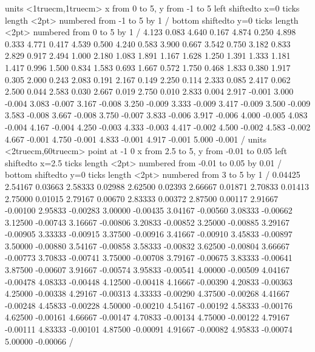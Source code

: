 \figure
\vbox{\beginpicture
\normalgraphs
\sevenpoint
\setcoordinatesystem units <1truecm,1truecm>
\setplotarea x from 0 to 5, y from -1 to 5
\axis left shiftedto x=0 ticks length <2pt> numbered from -1 to 5 by 1 /
\axis bottom shiftedto y=0 ticks length <2pt> numbered from 0 to 5 by 1 /
 4.123 0.083 4.640 0.167 4.874 0.250 4.898 0.333 4.771
0.417 4.539 0.500 4.240 0.583 3.900 0.667 3.542 0.750 3.182
0.833 2.829 0.917 2.494 1.000 2.180 1.083 1.891 1.167 1.628
1.250 1.391 1.333 1.181 1.417 0.996 1.500 0.834 1.583 0.693
1.667 0.572 1.750 0.468 1.833 0.380 1.917 0.305 2.000 0.243
2.083 0.191 2.167 0.149 2.250 0.114 2.333 0.085 2.417 0.062
2.500 0.044 2.583 0.030 2.667 0.019 2.750 0.010 2.833 0.004
2.917 -0.001 3.000 -0.004 3.083 -0.007 3.167 -0.008 3.250 -0.009
3.333 -0.009 3.417 -0.009 3.500 -0.009 3.583 -0.008 3.667 -0.008
3.750 -0.007 3.833 -0.006 3.917 -0.006 4.000 -0.005 4.083 -0.004
4.167 -0.004 4.250 -0.003 4.333 -0.003 4.417 -0.002 4.500 -0.002
4.583 -0.002 4.667 -0.001 4.750 -0.001 4.833 -0.001 4.917 -0.001
5.000 -0.001 /
\setcoordinatesystem units <2truecm,60truecm> point at -1 0
\setplotarea x from 2.5 to 5, y from -0.01 to 0.05
\axis left shiftedto x=2.5 ticks length <2pt> numbered from -0.01 to 0.05 by 0.01 /
\axis bottom shiftedto y=0 ticks length <2pt> numbered from 3 to 5 by 1 /
 0.04425 2.54167 0.03663 2.58333 0.02988 2.62500 0.02393 2.66667
0.01871
2.70833 0.01413 2.75000 0.01015 2.79167 0.00670 2.83333 0.00372 2.87500
0.00117
2.91667 -0.00100 2.95833 -0.00283 3.00000 -0.00435 3.04167 -0.00560
3.08333 -0.00662
3.12500 -0.00743 3.16667 -0.00806 3.20833 -0.00852 3.25000 -0.00885
3.29167 -0.00905
3.33333 -0.00915 3.37500 -0.00916 3.41667 -0.00910 3.45833 -0.00897
3.50000 -0.00880
3.54167 -0.00858 3.58333 -0.00832 3.62500 -0.00804 3.66667 -0.00773
3.70833 -0.00741
3.75000 -0.00708 3.79167 -0.00675 3.83333 -0.00641 3.87500 -0.00607
3.91667 -0.00574
3.95833 -0.00541 4.00000 -0.00509 4.04167 -0.00478 4.08333 -0.00448
4.12500 -0.00418
4.16667 -0.00390 4.20833 -0.00363 4.25000 -0.00338 4.29167 -0.00313
4.33333 -0.00290
4.37500 -0.00268 4.41667 -0.00248 4.45833 -0.00228 4.50000 -0.00210
4.54167 -0.00192
4.58333 -0.00176 4.62500 -0.00161 4.66667 -0.00147 4.70833 -0.00134
4.75000 -0.00122
4.79167 -0.00111 4.83333 -0.00101 4.87500 -0.00091 4.91667 -0.00082
4.95833 -0.00074
5.00000 -0.00066 /
\endpicture}

